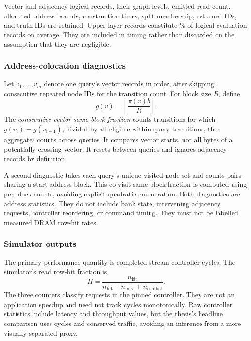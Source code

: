 \documentclass[11pt,a4paper]{report}
\begin{document}
Vector and adjacency logical records, their graph levels, emitted read count, allocated address bounds, construction times, split membership, returned IDs, and truth IDs are retained. Upper-layer records constitute \UpperFraction\% of logical evaluation records on average. They are included in timing rather than discarded on the assumption that they are negligible.

\subsubsection{Address-colocation diagnostics}
Let $v_1,\ldots,v_m$ denote one query's vector records in order, after skipping consecutive repeated node IDs for the transition count. For block size $R$, define
\begin{equation}
 g(v)=\left\lfloor\frac{\pi(v)b}{R}\right\rfloor.
\end{equation}
The \emph{consecutive-vector same-block fraction} counts transitions for which $g(v_i)=g(v_{i+1})$, divided by all eligible within-query transitions, then aggregates counts across queries. It compares vector starts, not all bytes of a potentially crossing vector. It resets between queries and ignores adjacency records by definition.

A second diagnostic takes each query's unique visited-node set and counts pairs sharing a start-address block. This co-visit same-block fraction is computed using per-block counts, avoiding explicit quadratic enumeration. Both diagnostics are address statistics. They do not include bank state, intervening adjacency requests, controller reordering, or command timing. They must not be labelled measured DRAM row-hit rates.

\subsubsection{Simulator outputs}
The primary performance quantity is completed-stream controller cycles. The simulator's read row-hit fraction is
\begin{equation}
 H=\frac{n_{\mathrm{hit}}}{n_{\mathrm{hit}}+n_{\mathrm{miss}}+n_{\mathrm{conflict}}}.
\end{equation}
The three counters classify requests in the pinned controller. They are not an application speedup and need not track cycles monotonically. Raw controller statistics include latency and throughput values, but the thesis's headline comparison uses cycles and conserved traffic, avoiding an inference from a more visually separated proxy.
\end{document}
